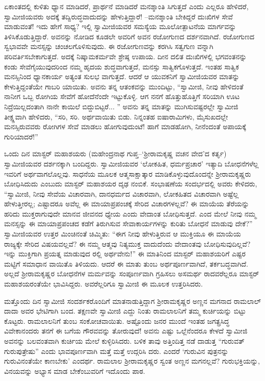ಏಕಾಂತದಲ್ಲಿ ಕುಳಿತು ಧ್ಯಾನ ಮಾಡಿದರೆ, ಪ್ರಾರ್ಥನೆ ಮಾಡಿದರೆ ಮನಶ್ಶಾಂತಿ ಸಿಗುತ್ತದೆ ಎಂದು ಎಲ್ಲರೂ ಹೇಳಿದರೆ, ಸ್ವಾಮೀಜಿಯವರು ಅದಕ್ಕೆ ತದ್ವಿರುದ್ಧವಾದುದನ್ನು ಹೇಳುತ್ತಿದ್ದಾರೆ! –ಮನಶ್ಶಾಂತಿ ಬೇಕಿದ್ದರೆ ದುಃಖಿಗಳ ಸೇವೆ ಮಾಡುವಂತೆ! ಇದು ಹೇಗೆ ಸಾಧ್ಯ? ಇಲ್ಲಿ ಸ್ವಾಮೀಜಿಯವರ ಸಮಸ್ಯೆಯ ಮೂಲೋತ್ಪಾಟನೆಯ ಮಾರ್ಗವನ್ನು ತಿಳಿಸಿಕೊಡುತ್ತಿದ್ದಾರೆ. ಅವನನ್ನು ನೋಡಿದ ಕೂಡಲೇ ಅವರಿಗೆ ಅವನ ರಜೋಗುಣದ ದರ್ಶನವಾಗಿದೆ. ರಜೋಗುಣದ ಸ್ವಭಾವವೇ ಮನಸ್ಸನ್ನು ಚಂಚಲಗೊಳಿಸುವುದು. ಈ ರಜೋಗುಣವನ್ನು ಕರಗಿಸಿ ಸತ್ವಗುಣ ವನ್ನಾಗಿ ಪರಿವರ್ತಿಸಬೇಕಾಗುತ್ತದೆ. ಅದಕ್ಕೆ ನಿಷ್ಕಾಮಕರ್ಮವೇ ಶ್ರೇಷ್ಠ ಉಪಾಯ. ದೀನ ದಲಿತ ದುಃಖಿಗಳಲ್ಲಿ ಭಗವಂತನನ್ನು ಕಂಡು ಸೇವೆಗೈಯುವುದರಿಂದ ನಮ್ಮ ಹೃದಯ ಶುದ್ಧವಾಗುತ್ತದೆ, ಮನಸ್ಸು ಸಾತ್ವಿಕಗೊಳುತ್ತದೆ. ಇಂತಹ ಸಾತ್ವಿಕ ಮನಸ್ಸಿನಿಂದ ಧ್ಯಾನಕಾರ್ಯ ಅತ್ಯಂತ ಸುಲಭ ವಾಗುತ್ತದೆ. ಆದರೆ ಆ ಯುವಕನಿಗೆ ಸ್ವಾಮೀಜಿಯವರ ಮಾತನ್ನು ಕೇಳುತ್ತಿದ್ದಂತೆಯೇ ಗಾಬರಿ ಯಾಯಿತು. ಅವನು ತನ್ನ ಆತಂಕವನ್ನು ಮುಂದಿಟ್ಟು, “ಸ್ವಾಮೀಜಿ, ನೀವು ಹೇಳಿದಂತೆ ನಾನೀಗ ಒಬ್ಬ ರೋಗಿಯ ಸೇವೆಗೆ ಹೋದೆನೆಂದೇ ಇಟ್ಟುಕೊಳ್ಳಿ. ಆಗ ನನಗೆ ಹೊತ್ತುಹೊತ್ತಿಗೆ ಸರಿಯಾಗಿ ಊಟ ನಿದ್ರೆಯಿಲ್ಲದಂತಾಗಿ ನಾನೇ ಕಾಯಿಲೆ ಬಿದ್ದುಬಿಟ್ಟರೆ... ” ಅವನು ತನ್ನ ಮಾತನ್ನು ಮುಗಿಸುವಷ್ಟರಲ್ಲೇ ಸ್ವಾಮೀಜಿ ತೀಕ್ಷ್ಣವಾಗಿ ಹೇಳಿದರು, “ಸರಿ, ಸರಿ. ಅರ್ಥವಾಯಿತು ಬಿಡು. ನಿನ್ನಂತಹ ಐಷಾರಾಮಿಗಳು, ಮೈಸುಖದಲ್ಲೇ ಮನಸ್ಸಿರುವವರು ರೋಗಿಗಳ ಸೇವೆ ಮಾಡಲು ಹೋಗುವುದುಂಟೆ! ಹಾಗೆ ಮಾಡಹೋಗಿ, ನೀನೆಂದಂತೆ ಅಪಾಯಕ್ಕೆ ಗುರಿಯಾದರೆ!”

ಒಂದು ದಿನ ಮಾಸ್ಟರ್ ಮಹಾಶಯರು (ಮಹೇಂದ್ರನಾಥ ಗುಪ್ತ–‘ಶ್ರೀರಾಮಕೃಷ್ಣ ವಚನ ವೇದ’ದ ಕರ್ತೃ) ಸ್ವಾಮೀಜಿಯವರ ದರ್ಶನಕ್ಕಾಗಿ ಬಂದಿದ್ದರು. ಸ್ವಾಮೀಜಿಯವರ ‘ಲೋಕಹಿತ, ಧರ್ಮಪ್ರಚಾರ’ ಇತ್ಯಾದಿ ಬೋಧನೆಗಳೆಲ್ಲ ಇವರಿಗೆ ಅರ್ಥವಾಗಲೊಲ್ಲವು. ಸಾಧನೆಯ ಮೂಲಕ ಆತ್ಮಸಾಕ್ಷಾತ್ಕಾರ ಮಾಡಿಕೊಳ್ಳುವುದೊಂದನ್ನೇ ಶ್ರೀರಾಮಕೃಷ್ಣರು ಬೋಧಿಸಿದುದು ಎಂಬುದು ಮಾಸ್ಟರ್ ಮಹಾಶಯರ ದೃಢ ನಂಬಿಕೆ. ಸಂಭಾಷಣೆಯ ಸಂದರ್ಭದಲ್ಲಿ ಅವರು ಕೇಳಿದರು, “ಸ್ವಾಮೀಜಿ, ನೀವು ಸೇವೆಯ ವಿಚಾರವಾಗಿ, ದಾನಧರ್ಮದ ವಿಚಾರವಾಗಿ, ಲೋಕಹಿತದ ವಿಚಾರವಾಗಿ ಅಷ್ಟೆಲ್ಲ ಹೇಳುತ್ತೀರಲ್ಲ; ಎಷ್ಟಾದರೂ ಅವೆಲ್ಲ ಈ ಮಾಯಾಪ್ರಪಂಚಕ್ಕೆ ಸೇರಿದ ವಿಚಾರಗಳಲ್ಲವೆ? ಈ ಮಾಯೆಯ ತೆರೆಯನ್ನು ಹರಿದು ಮುಕ್ತರಾಗುವುದೇ ಮಾನವ ಜೀವನದ ಧ್ಯೇಯ ಎಂದು ವೇದಾಂತ ಬೋಧಿಸುತ್ತದೆ. ಎಂದ ಮೇಲೆ ನೀವು ನಮ್ಮ ಮನಸ್ಸನ್ನು ಈ ಮಾಯಾಪ್ರಪಂಚದ ಕಡೆಗೆ ತಿರುಗಿಸುವ ಸೇವಾಕಾರ್ಯಗಳನ್ನು ಕುರಿತು ಬೋಧನೆ ಮಾಡುವು ದೇಕೆ?” ಸ್ವಾಮೀಜಿಯವರ ಉತ್ತರ ಮಿಂಚಿನಂತೆ ಚಿಮ್ಮಿತು: “ಈಗ ನೀವು ಹೇಳುತ್ತಿರುವ ಆ ಮುಕ್ತಿಯೂ ಈ ಮಾಯೆಯ ರಾಜ್ಯಕ್ಕೇ ಸೇರಿದ ವಿಷಯವಲ್ಲವೆ? ಈ ನಮ್ಮ ಆತ್ಮವು ನಿತ್ಯಮುಕ್ತ ವಾದುದೆಂದು ವೇದಾಂತವು ಬೋಧಿಸುವುದಿಲ್ಲವೆ? ಇನ್ನು ಮುಕ್ತಿಗಾಗಿ ಪ್ರಯತ್ನ ಮಾಡುವುದ ರಲ್ಲಿ ಅರ್ಥವೇನು!” ಈ ಮಾತಿನಿಂದ ಮಾಸ್ಟರ್ ಮಹಾಶಯರಿಗೆ ಎಷ್ಟರ ಮಟ್ಟಿಗೆ ಸಮಾಧಾನ ವಾಯಿತೊ ತಿಳಿಯದು. ಆದರೆ ಈ ಮಾತು ತುಂಬ ಅರ್ಥಪೂರ್ಣವಾಗಿದೆ, ತರ್ಕಬದ್ಧವಾಗಿದೆ. ಅಲ್ಲದೆ ಶ್ರೀರಾಮಕೃಷ್ಣರ ಬೋಧನೆಗಳ ಮರ್ಮವನ್ನು ಸಂಪೂರ್ಣವಾಗಿ ಗ್ರಹಿಸಲು ಅಸಮರ್ಥ ರಾದವರೆಲ್ಲರೂ ಮಾಸ್ಟರ್ ಮಹಾಶಯರಂತೆಯೇ ಭಾವಿಸಿದ್ದರು. ಅವರೆಲ್ಲರಿಗೂ ಸ್ವಾಮೀಜಿ ಈ ಮೂಲಕ ಉತ್ತರಿಸಿದರು.

ಮತ್ತೊಂದು ದಿನ ಸ್ವಾಮೀಜಿ ಸಂದರ್ಶಕರೊಂದಿಗೆ ಮಾತನಾಡುತ್ತಿದ್ದಾಗ ಶ್ರೀರಾಮಕೃಷ್ಣರ ಅಣ್ಣನ ಮಗನಾದ ರಾಮಲಾಲ್ ದಾದಾ ಅವರ ಭೇಟಿಗಾಗಿ ಬಂದ. ತಕ್ಷಣವೇ ಸ್ವಾಮೀಜಿ ಎದ್ದು ನಿಂತು ರಾಮಲಾಲನಿಗೆ ತಮ್ಮ ಕುರ್ಚಿಯನ್ನು ಬಿಟ್ಟು ಕೊಟ್ಟರು. ರಾಮಲಾಲನಿಗೆ ತುಂಬ ಸಂಕೋಚವಾಯಿತು. ಅಷ್ಟೊಂದು ಜನರ ಮುಂದೆ ಇಂತಹ ಜಗತ್ಪ್ರಸಿದ್ಧ ವಿವೇಕಾನಂದರು ತನಗೆ ಈ ಬಗೆಯ ಗೌರವವನ್ನು ತೋರುವುದೆ! ಅವನು ಎಷ್ಟು ಒಲ್ಲೆನೆಂದರೂ ಕೇಳದೆ ಸ್ವಾಮೀಜಿ ಅವನನ್ನು ಬಲವಂತವಾಗಿ ಕುರ್ಚಿಯ ಮೇಲೆ ಕುಳ್ಳಿರಿಸಿದರು. ಬಳಿಕ ತಾವು ಅತ್ತಿಂದಿತ್ತ ನಡೆ ದಾಡುತ್ತ “ಗುರುವತ್ ಗುರುಪುತ್ರೇಷು” ಎಂದು ಭಾವಪೂರ್ಣವಾಗಿ ಮತ್ತೆ ಮತ್ತೆ ಉದ್ಗರಿಸಿ ದರು. ಎಂದರೆ ‘ಗುರುವಿನ ಪುತ್ರನನ್ನು ಗುರುವಿನಂತೆಯೇ ಕಾಣಬೇಕು’ ಎಂದರ್ಥ. ರಾಮಲಾಲ ಶ್ರೀರಾಮಕೃಷ್ಣರ ಸ್ವಂತ ಅಣ್ಣನ ಮಗನಲ್ಲವೆ? ಗುರುಭಕ್ತಿಯನ್ನು, ವಿನಯವನ್ನು ಅಭ್ಯಾಸ ಮಾಡ ಬೇಕೆಂಬುವರಿಗೆ ಇದೊಂದು ಪಾಠ.

